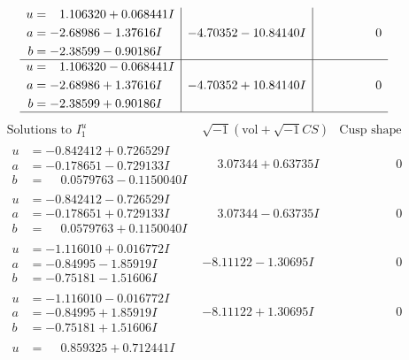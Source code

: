 \documentclass[1p]{elsarticle_modified}
\theoremstyle{definition}
\newcommand{\I}{\sqrt{-1}}
\begin{document}
$$\begin{array}{c|c|c}
\begin{aligned}
u &= \phantom{-}1.106320 + 0.068441 I \\
a &= -2.68986 - 1.37616 I \\
b &= -2.38599 - 0.90186 I\end{aligned}
 & -4.70352 - 10.84140 I & \phantom{-0.000000 } 0 \\ \hline\begin{aligned}
u &= \phantom{-}1.106320 - 0.068441 I \\
a &= -2.68986 + 1.37616 I \\
b &= -2.38599 + 0.90186 I\end{aligned}
 & -4.70352 + 10.84140 I & \phantom{-0.000000 } 0\\
 \hline 
 \end{array}$$\newpage$$\begin{array}{c|c|c}  
\text{Solutions to }I^u_{1}& \I (\text{vol} + \sqrt{-1}CS) & \text{Cusp shape}\\
 \hline 
\begin{aligned}
u &= -0.842412 + 0.726529 I \\
a &= -0.178651 - 0.729133 I \\
b &= \phantom{-}0.0579763 - 0.1150040 I\end{aligned}
 & \phantom{-}3.07344 + 0.63735 I & \phantom{-0.000000 } 0 \\ \hline\begin{aligned}
u &= -0.842412 - 0.726529 I \\
a &= -0.178651 + 0.729133 I \\
b &= \phantom{-}0.0579763 + 0.1150040 I\end{aligned}
 & \phantom{-}3.07344 - 0.63735 I & \phantom{-0.000000 } 0 \\ \hline\begin{aligned}
u &= -1.116010 + 0.016772 I \\
a &= -0.84995 - 1.85919 I \\
b &= -0.75181 - 1.51606 I\end{aligned}
 & -8.11122 - 1.30695 I & \phantom{-0.000000 } 0 \\ \hline\begin{aligned}
u &= -1.116010 - 0.016772 I \\
a &= -0.84995 + 1.85919 I \\
b &= -0.75181 + 1.51606 I\end{aligned}
 & -8.11122 + 1.30695 I & \phantom{-0.000000 } 0 \\ \hline\begin{aligned}
u &= \phantom{-}0.859325 + 0.712441 I \\

\end{aligned}
\end{array}$$
\end{document}
